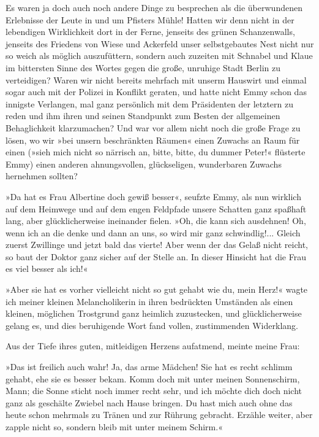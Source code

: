 Es waren ja doch auch noch andere Dinge zu besprechen als die
überwundenen Erlebnisse der Leute in und um Pfisters Mühle! Hatten
wir denn nicht in der lebendigen Wirklichkeit dort in der Ferne,
jenseits des grünen Schanzenwalls, jenseits des Friedens von Wiese
und Ackerfeld unser selbstgebautes Nest nicht nur so weich als
möglich auszufüttern, sondern auch zuzeiten mit Schnabel und Klaue
im bittersten Sinne des Wortes gegen die große, unruhige Stadt
Berlin zu verteidigen? Waren wir nicht bereits mehrfach mit unserm
Hauswirt und einmal sogar auch mit der Polizei in Konflikt geraten,
und hatte nicht Emmy schon das innigste Verlangen, mal ganz
persönlich mit dem Präsidenten der letztern zu reden und ihm ihren
und seinen Standpunkt zum Besten der allgemeinen Behaglichkeit
klarzumachen? Und war vor allem nicht noch die große Frage zu
lösen, wo wir »bei unsern beschränkten Räumen« einen Zuwachs an
Raum für einen (»sieh mich nicht so närrisch an, bitte, bitte, du
dummer Peter!« flüsterte Emmy) einen anderen ahnungsvollen,
glückseligen, wunderbaren Zuwachs hernehmen sollten?

»Da hat es Frau Albertine doch gewiß besser«, seufzte Emmy, als nun
wirklich auf dem Heimwege und auf dem engen Feldpfade unsere
Schatten ganz spaßhaft lang, aber glücklicherweise ineinander
fielen. »Oh, die kann sich ausdehnen! Oh, wenn ich an die denke und
dann an uns, so wird mir ganz schwindlig!... Gleich zuerst
Zwillinge und jetzt bald das vierte! Aber wenn der das Gelaß nicht
reicht, so baut der Doktor ganz sicher auf der Stelle an. In dieser
Hinsicht hat die Frau es viel besser als ich!«

»Aber sie hat es vorher vielleicht nicht so gut gehabt wie du, mein
Herz!« wagte ich meiner kleinen Melancholikerin in ihren bedrückten
Umständen als einen kleinen, möglichen Trostgrund ganz heimlich
zuzustecken, und glücklicherweise gelang es, und dies beruhigende
Wort fand vollen, zustimmenden Widerklang.

Aus der Tiefe ihres guten, mitleidigen Herzens aufatmend, meinte
meine Frau:

»Das ist freilich auch wahr! Ja, das arme Mädchen! Sie hat es recht
schlimm gehabt, ehe sie es besser bekam. Komm doch mit unter meinen
Sonnenschirm, Mann; die Sonne sticht noch immer recht sehr, und ich
möchte dich doch nicht ganz als geschälte Zwiebel nach Hause
bringen. Du hast mich auch ohne das heute schon mehrmals zu Tränen
und zur Rührung gebracht. Erzähle weiter, aber zapple nicht so,
sondern bleib mit unter meinem Schirm.«

